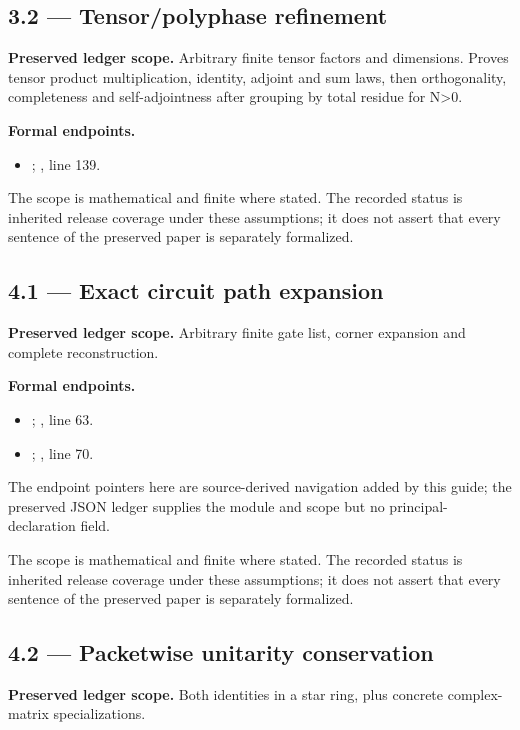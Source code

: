 \subsection{3.2 — Tensor/polyphase refinement}
\label{result:3.2}
\textbf{Preserved ledger scope.} Arbitrary finite tensor factors and dimensions. Proves tensor product multiplication, identity, adjoint and sum laws, then orthogonality, completeness and self-adjointness after grouping by total residue for N>0.

\textbf{Formal endpoints.}\begin{itemize}
\item {}; , line 139.
\end{itemize}
The scope is mathematical and finite where stated. The recorded status is inherited release coverage under these assumptions; it does not assert that every sentence of the preserved paper is separately formalized.

\subsection{4.1 — Exact circuit path expansion}
\label{result:4.1}
\textbf{Preserved ledger scope.} Arbitrary finite gate list, corner expansion and complete reconstruction.

\textbf{Formal endpoints.}\begin{itemize}
\item {}; , line 63.
\item {}; , line 70.
\end{itemize}
The endpoint pointers here are source-derived navigation added by this guide; the preserved JSON ledger supplies the module and scope but no principal-declaration field.

The scope is mathematical and finite where stated. The recorded status is inherited release coverage under these assumptions; it does not assert that every sentence of the preserved paper is separately formalized.

\subsection{4.2 — Packetwise unitarity conservation}
\label{result:4.2}
\textbf{Preserved ledger scope.} Both identities in a star ring, plus concrete complex-matrix specializations.

